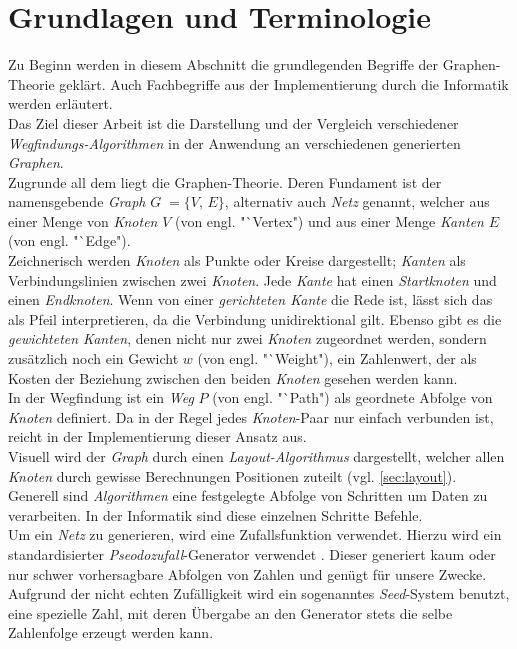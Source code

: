 \documentclass[12pt]{article}
\begin{document}
\section{Grundlagen und Terminologie}
\label{sec:basics}
Zu Beginn werden in diesem Abschnitt die grundlegenden Begriffe der Graphen-Theorie geklärt. Auch Fachbegriffe aus der Implementierung durch die Informatik werden erläutert.
\\
Das Ziel dieser Arbeit ist die Darstellung und der Vergleich verschiedener \textit{Wegfindungs-Algorithmen} in der Anwendung an verschiedenen generierten \textit{Graphen}.
\\
Zugrunde all dem liegt die Graphen-Theorie. Deren Fundament ist der namensgebende \textit{Graph} $G\; = \{V,\,E\}$, alternativ auch \textit{Netz} genannt, welcher aus einer Menge von \textit{Knoten} $V$ 
(von engl. "`Vertex") und aus einer Menge \textit{Kanten} $E$ (von engl. "`Edge").
\\
Zeichnerisch werden \textit{Knoten} als Punkte oder Kreise dargestellt; \textit{Kanten} als Verbindungslinien zwischen zwei \textit{Knoten}. Jede \textit{Kante} hat einen \textit{Startknoten} und
einen \textit{Endknoten}. Wenn von einer \textit{gerichteten Kante} die Rede ist, lässt sich das als Pfeil interpretieren, da die Verbindung unidirektional gilt. Ebenso gibt es die \textit{gewichteten Kanten}, 
denen nicht nur zwei \textit{Knoten} zugeordnet werden, sondern zusätzlich noch ein Gewicht $w$ (von engl. "`Weight"), ein Zahlenwert, der als Kosten der Beziehung zwischen den beiden \textit{Knoten} gesehen werden kann.
\\
In der Wegfindung ist ein \textit{Weg} $P$ (von engl. "`Path") als geordnete Abfolge von \textit{Knoten} definiert. Da in der Regel jedes \textit{Knoten}-Paar nur einfach verbunden ist, reicht in der Implementierung 
dieser Ansatz aus.
\\
Visuell wird der \textit{Graph} durch einen \textit{Layout-Algorithmus} dargestellt, welcher allen \textit{Knoten} durch gewisse Berechnungen Positionen zuteilt (vgl. \autoref{sec:layout}).
\\
Generell sind \textit{Algorithmen} eine festgelegte Abfolge von Schritten um Daten zu verarbeiten. In der Informatik sind diese einzelnen Schritte Befehle.
\\
Um ein \textit{Netz} zu generieren, wird eine Zufallsfunktion verwendet. Hierzu wird ein standardisierter \textit{Pseodozufall}-Generator verwendet \cite{random}. Dieser generiert kaum oder nur schwer vorhersagbare Abfolgen 
von Zahlen und genügt für unsere Zwecke. Aufgrund der nicht echten Zufälligkeit wird ein sogenanntes \textit{Seed}-System benutzt, eine spezielle Zahl, mit deren Übergabe an den Generator stets die selbe Zahlenfolge erzeugt
werden kann.
\newpage
\end{document}
